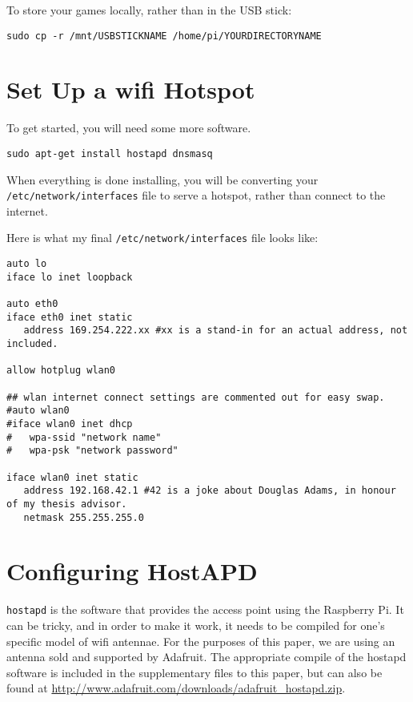 To store your games locally, rather than in the USB stick:
\begin{lstlisting}
sudo cp -r /mnt/USBSTICKNAME /home/pi/YOURDIRECTORYNAME
\end{lstlisting}

\section{Set Up a wifi Hotspot}
To get started, you will need some more software.

\begin{lstlisting}
sudo apt-get install hostapd dnsmasq
\end{lstlisting}

When everything is done installing, you will be converting your \texttt{/etc/network/interfaces} file to serve a hotspot, rather than connect to the internet. 

Here is what my final \texttt{/etc/network/interfaces} file looks like:

\begin{lstlisting}
auto lo
iface lo inet loopback

auto eth0
iface eth0 inet static
   address 169.254.222.xx #xx is a stand-in for an actual address, not included.

allow hotplug wlan0

## wlan internet connect settings are commented out for easy swap.
#auto wlan0
#iface wlan0 inet dhcp
#   wpa-ssid "network name"
#   wpa-psk "network password"

iface wlan0 inet static
   address 192.168.42.1 #42 is a joke about Douglas Adams, in honour of my thesis advisor.
   netmask 255.255.255.0

\end{lstlisting}

\section{Configuring HostAPD}
\texttt{hostapd} is the software that provides the access point using the Raspberry Pi. It can be tricky, and in order to make it work, it needs to be compiled for one's specific model of wifi antennae. For the purposes of this paper, we are using an antenna sold and supported by Adafruit. The appropriate compile of the hostapd software is included in the supplementary files to this paper, but can also be found at \url{http://www.adafruit.com/downloads/adafruit_hostapd.zip}.

